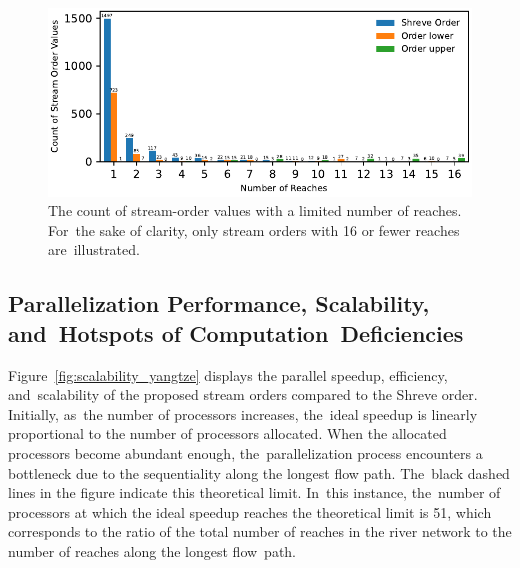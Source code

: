 \documentclass[water,article,accept,pdftex,moreauthors]{Definitions/mdpi}
\begin{document}
\begin{figure}[H]
    \includegraphics[width=13.5 cm]{fig/stream_count_yangtze.pdf}
    \caption{The count of stream-order values with a limited number of reaches. For~the sake of clarity, only stream orders with 16 or fewer reaches are~illustrated. \label{fig:cumulative_count_yangtze}}
\end{figure}
\unskip

\subsection{Parallelization Performance, Scalability, and~Hotspots of Computation~Deficiencies}
\label{sec:parallelization_yangtze}

Figure~\ref{fig:scalability_yangtze} displays the parallel speedup, efficiency, and~scalability of the proposed stream orders compared to the Shreve order. Initially, as~the number of processors increases, the~ideal speedup is linearly proportional to the number of processors allocated. When the allocated processors become abundant enough, the~parallelization process encounters a bottleneck due to the sequentiality along the longest flow path. The~black dashed lines in the figure indicate this theoretical limit. In~this instance, the~number of processors at which the ideal speedup reaches the theoretical limit is 51, which corresponds to the ratio of the total number of reaches in the river network to the number of reaches along the longest flow~path.
\end{document}
